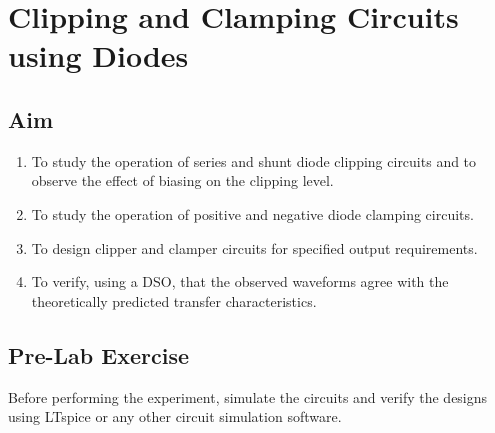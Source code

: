 %

\chapter{Clipping and Clamping Circuits using Diodes}
\label{sec:expt1}

\section{Aim}
\begin{enumerate}[label=(\roman*)]
	\item To study the operation of series and shunt diode clipping circuits and to observe the effect of biasing on the clipping level.
	\item To study the operation of positive and negative diode clamping circuits.
	\item To design clipper and clamper circuits for specified output requirements.
	\item To verify, using a DSO, that the observed waveforms agree with the theoretically predicted transfer characteristics.
\end{enumerate}
\section{Pre-Lab Exercise}
Before performing the experiment, simulate the circuits and verify the designs using LTspice or any other circuit simulation software. 
